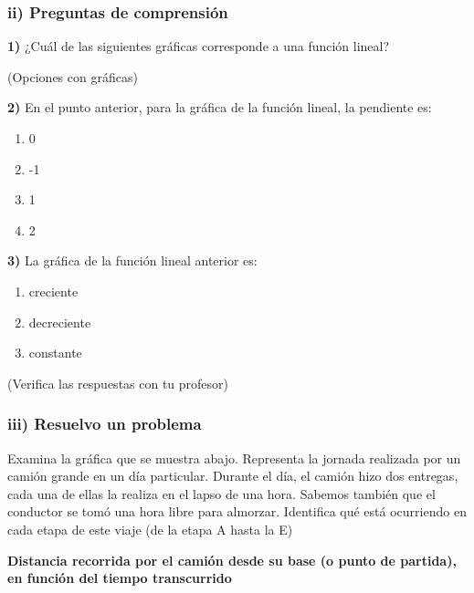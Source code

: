 \documentclass[12pt,a4paper]{article}
\begin{document}
\subsubsection*{ii) Preguntas de comprensión}

\textbf{1)} ¿Cuál de las siguientes gráficas corresponde a una función lineal?

(Opciones con gráficas)

\textbf{2)} En el punto anterior, para la gráfica de la función lineal, la pendiente es:

\begin{enumerate}[label=\alph*.]
\item 0
\item -1
\item 1
\item 2
\end{enumerate}

\textbf{3)} La gráfica de la función lineal anterior es:

\begin{enumerate}[label=\alph*.]
\item creciente
\item decreciente
\item constante
\end{enumerate}

(Verifica las respuestas con tu profesor)

\subsubsection*{iii) Resuelvo un problema}

Examina la gráfica que se muestra abajo. Representa la jornada realizada por un camión grande en un día particular. Durante el día, el camión hizo dos entregas, cada una de ellas la realiza en el lapso de una hora. Sabemos también que el conductor se tomó una hora libre para almorzar. Identifica qué está ocurriendo en cada etapa de este viaje (de la etapa A hasta la E)

\textbf{Distancia recorrida por el camión desde su base (o punto de partida), en función del tiempo transcurrido}

\begin{center}
\end{center}
\end{document}
